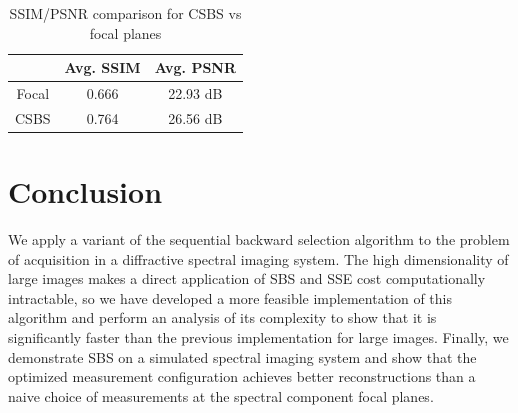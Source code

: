 \documentclass{article}
\begin{document}
\vspace{-0.15 in}
\begin{table}[h]
\caption{SSIM/PSNR comparison for CSBS vs focal planes}
\vspace{0.08 in}
\centering
\begin{tabular}{|c|c|c|}
\hline
      & Avg. SSIM  & Avg. PSNR  \\ \hline
Focal & 0.666 & 22.93 dB \\ \hline
CSBS  & 0.764 & 26.56 dB \\ \hline
\end{tabular}
\label{tab:ssims}
\end{table}
\vspace{-0.15 in}

\section{Conclusion}

We apply a variant of the sequential backward selection algorithm to the problem
of acquisition in a diffractive spectral imaging system.  The high
dimensionality of large images makes a direct application of SBS and SSE cost
computationally intractable, so we have developed a more feasible implementation
of this algorithm and perform an analysis of its complexity to show that it is
significantly faster than the previous implementation for large images.
Finally, we demonstrate SBS on a simulated spectral imaging system and show that
the optimized measurement configuration achieves better reconstructions than a
naive choice of measurements at the spectral component focal planes.

\vfill\pagebreak



\end{document}
